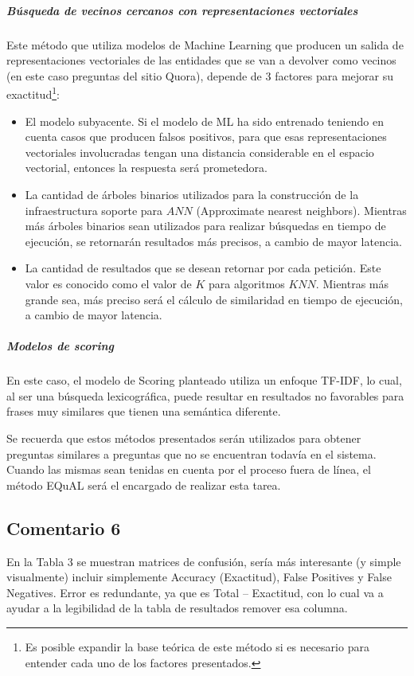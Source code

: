 \subparagraph{Búsqueda de vecinos cercanos con representaciones vectoriales}
Este método que utiliza modelos de Machine Learning que producen un salida de representaciones vectoriales de las entidades que se van a devolver como vecinos (en este caso preguntas del sitio Quora), depende de 3 factores para mejorar su exactitud\footnote{Es posible expandir la base teórica de este método si es necesario para entender cada uno de los factores presentados.}:
\begin{itemize}
	\item El modelo subyacente. Si el modelo de ML ha sido entrenado teniendo en cuenta casos que producen falsos positivos, para que esas representaciones vectoriales involucradas tengan una distancia considerable en el espacio vectorial, entonces la respuesta será prometedora.
	\item La cantidad de árboles binarios utilizados para la construcción de la infraestructura soporte para \(ANN\) (Approximate nearest neighbors). Mientras más árboles binarios sean utilizados para realizar búsquedas en tiempo de ejecución, se retornarán resultados más precisos, a cambio de mayor latencia.
	\item La cantidad de resultados que se desean retornar por cada petición. Este valor es conocido como el valor de \(K\) para algoritmos \(KNN\). Mientras más grande sea, más preciso será el cálculo de similaridad en tiempo de ejecución, a cambio de mayor latencia.
\end{itemize}

\subparagraph{Modelos de scoring}
En este caso, el modelo de Scoring planteado utiliza un enfoque TF-IDF, lo cual, al ser una búsqueda lexicográfica, puede resultar en resultados no favorables para frases muy similares que tienen una semántica diferente.

\bigskip

Se recuerda que estos métodos presentados serán utilizados para obtener preguntas similares a preguntas que no se encuentran todavía en el sistema. Cuando las mismas sean tenidas en cuenta por el proceso fuera de línea, el método EQuAL será el encargado de realizar esta tarea.

\subsection*{Comentario 6}
En la Tabla 3 se muestran matrices de confusión, sería más interesante (y simple visualmente) incluir simplemente Accuracy (Exactitud), False Positives y False Negatives. Error es redundante, ya que es Total – Exactitud, con lo cual va a ayudar a la legibilidad de la tabla de resultados remover esa columna.

